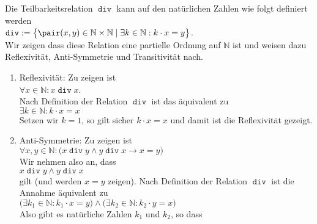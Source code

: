 \example 
Die Teilbarkeitsrelation $\mathop{\mathtt{div}}$ kann auf den natürlichen Zahlen
wie folgt definiert werden 
\\[0.2cm]
\hspace*{1.3cm}
$ \mathop{\mathtt{div}} := 
   \bigl\{ \pair(x,y) \in \mathbb{N} \times \mathbb{N} \mid \exists k \in \mathbb{N}: k \cdot x = y\bigr\}$.
\\[0.2cm] 
Wir zeigen dass diese Relation eine partielle Ordnung auf $\mathbb{N}$ ist und weisen dazu
Reflexivität, Anti-Symmetrie und Transitivität nach.
\begin{enumerate}
\item Reflexivität: Zu zeigen ist 
      \\[0.2cm]
      \hspace*{1.3cm}
      $\forall x \in \mathbb{N}: x \mathop{\mathtt{div}} x$.
      \\[0.2cm]
      Nach Definition der Relation $\mathop{\mathtt{div}}$ ist  das äquivalent zu
      \\[0.2cm]
      \hspace*{1.3cm}
      $\exists k \in \mathbb{N}: k \cdot x = x$ 
      \\[0.2cm]
      Setzen wir $k=1$, so gilt sicher $k \cdot x = x$ und damit ist die Reflexivität
      gezeigt.
\item Anti-Symmetrie: Zu zeigen ist 
      \\[0.2cm]
      \hspace*{1.3cm}
      $\forall x, y \in \mathbb{N}:\bigl( x \mathop{\mathtt{div}} y \wedge y \mathop{\mathtt{div}} x \rightarrow x = y\bigr)$
      \\[0.2cm] 
      Wir nehmen also an, dass 
      \\[0.2cm]
      \hspace*{1.3cm}
      $x \mathop{\mathtt{div}} y \wedge y \mathop{\mathtt{div}} x$
      \\[0.2cm]
      gilt (und werden $x=y$ zeigen).  Nach Definition der Relation $\mathop{\mathtt{div}}$
      ist die Annahme äquivalent zu 
      \\[0.2cm]
      \hspace*{1.3cm}
      $\bigl(\exists k_1 \in \mathbb{N}: k_1 \cdot x = y \bigr) \wedge
       \bigl(\exists k_2 \in \mathbb{N}: k_2 \cdot y = x \bigr)$ 
      \\[0.2cm]
      Also gibt es natürliche Zahlen $k_1$ und $k_2$, so dass 
      \\[0.2cm]
      \hspace*{1.3cm}

\end{enumerate}
